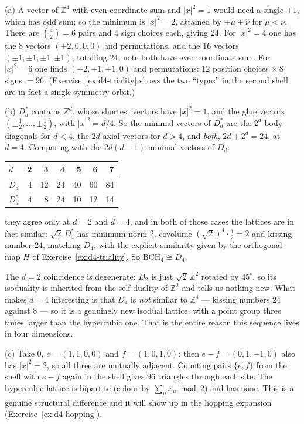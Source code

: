{(a) A vector of $\mathbb{Z}^4$ with even coordinate sum and $|x|^2=1$ would need
a single $\pm1$, which has odd sum; so the minimum is $|x|^2=2$, attained by
$\pm\hat\mu\pm\hat\nu$ for $\mu<\nu$. There are $\binom42=6$ pairs and $4$ sign
choices each, giving $24$. For $|x|^2=4$ one has the $8$ vectors
$(\pm2,0,0,0)$ and permutations, and the $16$ vectors $(\pm1,\pm1,\pm1,\pm1)$,
totalling $24$; note both have even coordinate sum. For $|x|^2=6$ one finds
$(\pm2,\pm1,\pm1,0)$ and permutations: $12$ position choices $\times\,8$ signs
$=96$. (Exercise~\ref{ex:d4-triality} shows the two ``types'' in the second
shell are in fact a single symmetry orbit.)

(b) $D_d^*$ contains $\mathbb{Z}^d$, whose shortest vectors have $|x|^2=1$, and
the glue vectors $(\pm\tfrac12,\dots,\pm\tfrac12)$, with $|x|^2=d/4$. So the
minimal vectors of $D_d^*$ are the $2^d$ body diagonals for $d<4$, the $2d$
axial vectors for $d>4$, and \emph{both}, $2d+2^d=24$, at $d=4$. Comparing with
the $2d(d-1)$ minimal vectors of $D_d$:
\begin{center}
\begin{tabular}{lrrrrrr}
 $d$        & 2 & 3 & 4 & 5 & 6 & 7\\ \hline
 $D_d$      & 4 & 12 & 24 & 40 & 60 & 84\\
 $D_d^*$    & 4 &  8 & 24 & 10 & 12 & 14
\end{tabular}
\end{center}
they agree only at $d=2$ and $d=4$, and in both of those cases the lattices are
in fact similar: $\sqrt{2}\,D_4^*$ has minimum norm $2$, covolume
$(\sqrt2)^4\cdot\tfrac12=2$ and kissing number $24$, matching $D_4$, with the
explicit similarity given by the orthogonal map $H$ of
Exercise~\ref{ex:d4-triality}. So $\mathrm{BCH}_4\cong D_4$.

The $d=2$ coincidence is degenerate: $D_2$ is just $\sqrt2\,\mathbb{Z}^2$
rotated by $45^\circ$, so its isoduality is inherited from the self-duality of
$\mathbb{Z}^2$ and tells us nothing new. What makes $d=4$ interesting is that
$D_4$ is \emph{not} similar to $\mathbb{Z}^4$ --- kissing numbers $24$ against
$8$ --- so it is a genuinely new isodual lattice, with a point group three
times larger than the hypercubic one. That is the entire reason this sequence
lives in four dimensions.

(c) Take $0$, $e=(1,1,0,0)$ and $f=(1,0,1,0)$: then $e-f=(0,1,-1,0)$ also has
$|x|^2=2$, so all three are mutually adjacent. Counting pairs $\{e,f\}$ from
the shell with $e-f$ again in the shell gives $96$ triangles through each site.
The hypercubic lattice is bipartite (colour by $\sum_\mu x_\mu \bmod 2$) and has
none. This is a genuine structural difference and it will show up in the
hopping expansion (Exercise~\ref{ex:d4-hopping}).

}
